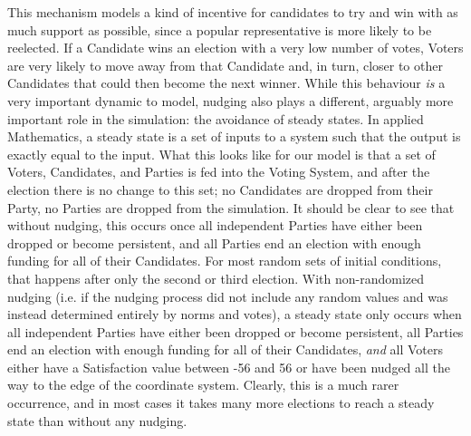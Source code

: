 \documentclass[12pt]{article}
\begin{document}
\qquad This mechanism models a kind of incentive for candidates to try and win with as much support as possible, since a popular representative is more likely to be reelected. If a Candidate wins an election with a very low number of votes, Voters are very likely to move away from that Candidate and, in turn, closer to other Candidates that could then become the next winner. While this behaviour \textit{is} a very important dynamic to model, nudging also plays a different, arguably more important role in the simulation: the avoidance of steady states. In applied Mathematics, a steady state is a set of inputs to a system such that the output is exactly equal to the input. What this looks like for our model is that a set of Voters, Candidates, and Parties is fed into the Voting System, and after the election there is no change to this set; no Candidates are dropped from their Party, no Parties are dropped from the simulation. It should be clear to see that without nudging, this occurs once all independent Parties have either been dropped or become persistent, and all Parties end an election with enough funding for all of their Candidates. For most random sets of initial conditions, that happens after only the second or third election. With non-randomized nudging (i.e. if the nudging process did not include any random values and was instead determined entirely by norms and votes), a steady state only occurs when all independent Parties have either been dropped or become persistent, all Parties end an election with enough funding for all of their Candidates, \textit{and} all Voters either have a Satisfaction value between -56 and 56 or have been nudged all the way to the edge of the coordinate system. Clearly, this is a much rarer occurrence, and in most cases it takes many more elections to reach a steady state than without any nudging. \\
\end{document}
